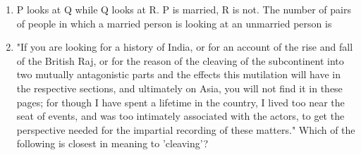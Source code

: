 \documentclass[journal,12pt,onecolumn]{IEEEtran}
\theoremstyle{remark}
\begin{document}
\begin{enumerate}
                \begin{enumerate}
                \end{enumerate}
    \item P looks at Q while Q looks at R. P is married, R is not. The number of pairs of people in which a married person is looking at an unmarried person is \hfill{}
                \begin{enumerate}
                \end{enumerate}
    \item "If you are looking for a history of India, or for an account of the rise and fall of the British Raj, or for the reason of the cleaving of the subcontinent into two mutually antagonistic parts and the effects this mutilation will have in the respective sections, and ultimately on Asia, you will not find it in these pages; for though I have spent a lifetime in the country, I lived too near the seat of events, and was too intimately associated with the actors, to get the perspective needed for the impartial recording of these matters."  
    Which of the following is closest in meaning to 'cleaving'? \hfill{}
        \begin{enumerate}
        \end{enumerate}
    

\end{enumerate}
\end{document}

